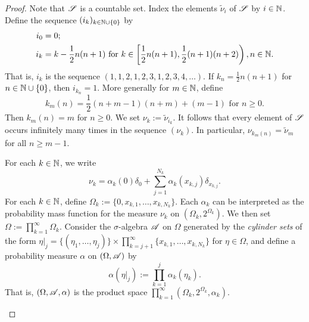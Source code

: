 \begin{proof}
    Note that $\scrS$ is a countable set. Index the elements $\widetilde{\nu}_i$ of $\scrS$ by $i \in \bbN$.
    Define the sequence $(i_k)_{k \in \bbN \cup \{0\}}$ by 
    \begin{equation}
        \begin{aligned}
            i_0 &= 0; \\
            i_k &= k - \frac{1}{2}n(n+1) \text{ for } k \in \left[ \frac{1}{2}n(n+1), \frac{1}{2}(n+1)(n+2) \right), n \in \bbN.
        \end{aligned}
    \end{equation}
    That is, $i_k$ is the sequence $(1,1,2,1,2,3,1,2,3,4,\dots)$. If $k_n = \frac{1}{2}n(n+1)$ for $n \in \bbN \cup \{0\}$, then $i_{k_n} = 1$. More generally for $m \in \bbN$, define
    \begin{equation}
        k_m(n) = \frac{1}{2}(n+m-1)(n+m) + (m-1) \text{ for } n \geq 0.
    \end{equation}
    Then $k_m(n) = m$ for $n \geq 0$. We set $\nu_k := \widetilde{\nu}_{i_k}$. It follows that every element of $\scrS$ occurs infinitely many times in the sequence $(\nu_k)$. In particular, $\nu_{k_m(n)} = \widetilde{\nu}_m$ for all $n \geq m-1$.

    For each $k \in \bbN$, we write 
    \begin{equation}
        \nu_k = \alpha_k(0) \delta_0 + \sum_{j = 1}^{N_k} \alpha_k(x_{k,j}) \delta_{x_{k,j}}.
    \end{equation}
    For each $k \in \bbN$, define $\Omega_k := \{0,x_{k,1},\dots,x_{k,N_k}\}$. Each $\alpha_k$ can be interpreted as the probability mass function for the measure $\nu_k$ on $(\Omega_k, 2^{\Omega_k})$. We then set $\Omega := \prod_{k=1}^\infty \Omega_k$. Consider the $\sigma$-algebra $\scrA$ on $\Omega$ generated by the \textit{cylinder sets} of the form $\eta \vert_j = \{(\eta_1,\dots,\eta_j)\} \times \prod_{k=j+1}^\infty \{ x_{k,1},\dots,x_{k,N_k} \}$ for $\eta \in \Omega$, and define a probability measure $\alpha$ on $(\Omega, \scrA)$ by 
    \begin{equation}
        \alpha(\eta \vert_j) := \prod_{k=1}^j \alpha_k(\eta_k).
    \end{equation}
    That is, $(\Omega, \scrA, \alpha)$ is the product space $\prod_{k=1}^\infty (\Omega_k, 2^{\Omega_k}, \alpha_k)$.

    \begin{figure} 
        \begin{tikzpicture}


\end{tikzpicture}
\end{figure}
\end{proof}
